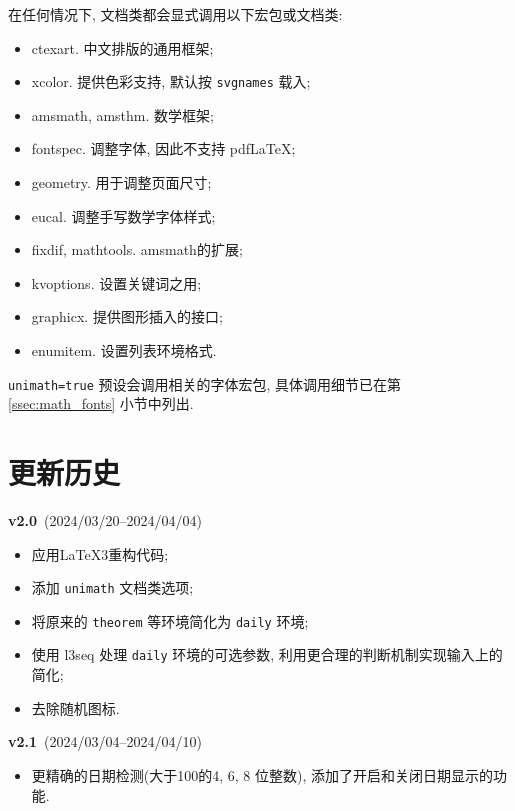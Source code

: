 \documentclass{SYSUDaily}
\begin{document}
在任何情况下, 文档类都会显式调用以下宏包或文档类:
\begin{itemize}[parsep=0pt,itemsep=0pt]
	\item
			\textsf{ctexart}. 中文排版的通用框架;
	\item
			\textsf{xcolor}. 提供色彩支持, 默认按 \verb|svgnames| 载入;
	\item
			\textsf{amsmath}, \textsf{amsthm}. 数学框架;
	\item
			\textsf{fontspec}. 调整字体, 因此不支持 pdf\LaTeX{};
	\item
			\textsf{geometry}. 用于调整页面尺寸;
	\item
			\textsf{eucal}. 调整手写数学字体样式;
	\item
			\textsf{fixdif}, \textsf{mathtools}. \textsf{amsmath}的扩展;
	\item
			\textsf{kvoptions}. 设置关键词之用;
	\item
			\textsf{graphicx}. 提供图形插入的接口;
	\item
			\textsf{enumitem}. 设置列表环境格式.
\end{itemize}
\verb|unimath=true| 预设会调用相关的字体宏包, 具体调用细节已在第 \ref{ssec:math_fonts} 小节中列出.

\section{更新历史}
\begin{flushleft}
	\footnotesize
	\textbf{v2.0}~(2024/03/20--2024/04/04)
	\begin{itemize}[parsep=0pt,itemsep=0pt]
		\item
				应用\LaTeX{3}重构代码;
		\item
				添加 \verb|unimath| 文档类选项;
		\item
				将原来的 \verb|theorem| 等环境简化为 \verb|daily| 环境;
		\item
				使用 \textsf{l3seq} 处理 \verb|daily| 环境的可选参数, 利用更合理的判断机制实现输入上的简化;
		\item
				去除随机图标.
	\end{itemize}

	\textbf{v2.1}~(2024/03/04--2024/04/10)
	\begin{itemize}[parsep=0pt,itemsep=0pt]
		\item
				更精确的日期检测(大于100的4, 6, 8 位整数), 添加了开启和关闭日期显示的功能.
	\end{itemize}
\end{flushleft}
\end{document}
